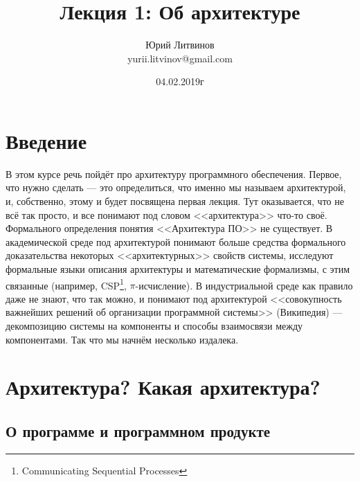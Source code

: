 \documentclass[a5paper]{article}
\title{Лекция 1: Об архитектуре}
\author{Юрий Литвинов\\\small{yurii.litvinov@gmail.com}}
\date{04.02.2019г}
\begin{document}
\maketitle
\thispagestyle{empty}

\section{Введение}

В этом курсе речь пойдёт про архитектуру программного обеспечения. Первое, что нужно сделать --- это определиться, что именно мы называем архитектурой, и, собственно, этому и будет посвящена первая лекция. Тут оказывается, что не всё так просто, и все понимают под словом <<архитектура>> что-то своё. Формального определения понятия <<Архитектура ПО>> не существует. В академической среде под архитектурой понимают больше средства формального доказательства некоторых <<архитектурных>> свойств системы, исследуют формальные языки описания архитектуры и математические формализмы, с этим связанные (например, CSP\footnote{Communicating Sequential Processes}, $\pi$-исчисление). В индустриальной среде как правило даже не знают, что так можно, и понимают под архитектурой <<совокупность важнейших решений об организации программной системы>> (\textcopyright Википедия) --- декомпозицию системы на компоненты и способы взаимосвязи между компонентами. Так что мы начнём несколько издалека.

\section{Архитектура? Какая архитектура?}

\subsection{О программе и программном продукте}
\end{document}
